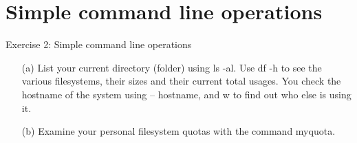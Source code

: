 \documentclass[handout]{beamer} %
\begin{document}
{
\section{Simple command line operations}
%
\begin{frame}{Exercise 2: Simple command line operations}
\begin{itemize}

\item[(a)]{List your current directory (folder) using \alert{ls -al}. Use \alert{df -h} to see the various filesystems, their sizes and their current total usages. You check the hostname of the system using -- \alert{hostname}, and \alert{w} to find out who else is using it.}

\item[(b)]{Examine your personal filesystem quotas with the command \alert{myquota}.}
\end{itemize}
\end{frame}
}
\end{document}
